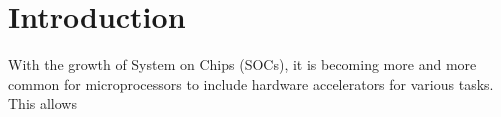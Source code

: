 \chapter{Introduction}
With the growth of System on Chips (SOCs), it is becoming more and more common for microprocessors to include hardware accelerators for various tasks. This allows 